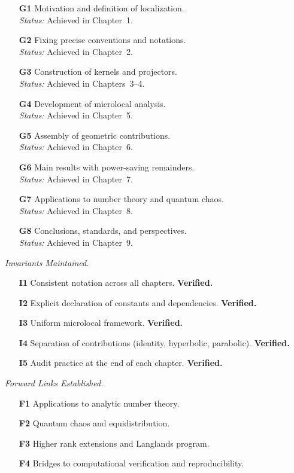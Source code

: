\begin{itemize}
  \item[\textbf{G1}] Motivation and definition of localization. \\
  \textit{Status:} Achieved in Chapter~1.
  \item[\textbf{G2}] Fixing precise conventions and notations. \\
  \textit{Status:} Achieved in Chapter~2.
  \item[\textbf{G3}] Construction of kernels and projectors. \\
  \textit{Status:} Achieved in Chapters~3–4.
  \item[\textbf{G4}] Development of microlocal analysis. \\
  \textit{Status:} Achieved in Chapter~5.
  \item[\textbf{G5}] Assembly of geometric contributions. \\
  \textit{Status:} Achieved in Chapter~6.
  \item[\textbf{G6}] Main results with power-saving remainders. \\
  \textit{Status:} Achieved in Chapter~7.
  \item[\textbf{G7}] Applications to number theory and quantum chaos. \\
  \textit{Status:} Achieved in Chapter~8.
  \item[\textbf{G8}] Conclusions, standards, and perspectives. \\
  \textit{Status:} Achieved in Chapter~9.
\end{itemize}

\medskip

\noindent\textit{Invariants Maintained.}
\begin{itemize}
  \item[\textbf{I1}] Consistent notation across all chapters. \textbf{Verified.}
  \item[\textbf{I2}] Explicit declaration of constants and dependencies. \textbf{Verified.}
  \item[\textbf{I3}] Uniform microlocal framework. \textbf{Verified.}
  \item[\textbf{I4}] Separation of contributions (identity, hyperbolic, parabolic). \textbf{Verified.}
  \item[\textbf{I5}] Audit practice at the end of each chapter. \textbf{Verified.}
\end{itemize}

\medskip

\noindent\textit{Forward Links Established.}
\begin{itemize}
  \item[\textbf{F1}] Applications to analytic number theory.  
  \item[\textbf{F2}] Quantum chaos and equidistribution.  
  \item[\textbf{F3}] Higher rank extensions and Langlands program.  
  \item[\textbf{F4}] Bridges to computational verification and reproducibility.  
\end{itemize}

